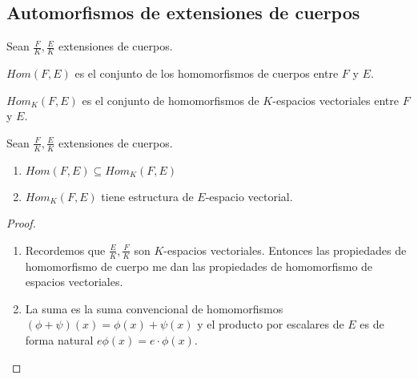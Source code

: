 \subsection{Automorfismos de extensiones de cuerpos}

\begin{definition}
Sean $\frac{F}{K},\frac{E}{K}$ extensiones de cuerpos. 

$Hom(F,E)$ es el conjunto de los homomorfismos de cuerpos entre $F$ y $E$. 

$Hom_K(F,E)$ es el conjunto de homomorfismos de $K$-espacios vectoriales entre $F$ y $E$.
\end{definition}

\begin{proposition}
Sean $\frac{F}{K},\frac{E}{K}$ extensiones de cuerpos. 

\begin{enumerate}
\item $Hom(F,E) \subseteq Hom_K(F,E)$
\item $Hom_K(F,E)$ tiene estructura de $E$-espacio vectorial.
\end{enumerate}
\end{proposition}
\begin{proof}
\begin{enumerate}
\item Recordemos que $\frac{E}{K},\frac{F}{K}$ son $K$-espacios vectoriales. Entonces las propiedades de homomorfismo de cuerpo me dan las propiedades de homomorfismo de espacios vectoriales. 
\item La suma es la suma convencional de homomorfismos $(\phi + \psi)(x) = \phi(x) + \psi(x)$ y el producto por escalares de $E$ es de forma natural $e \phi(x) = e \cdot \phi(x)$. 
\end{enumerate}
\end{proof}

